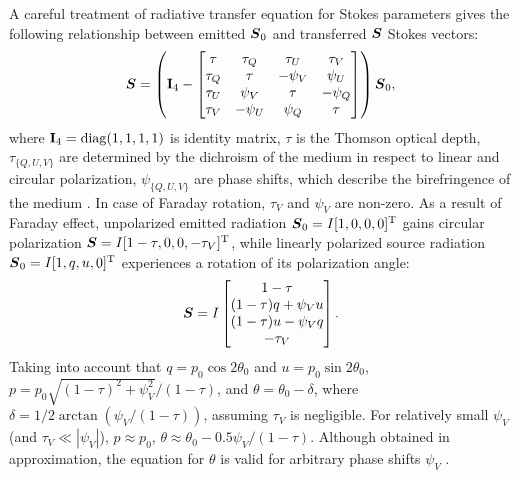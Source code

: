 A careful treatment of radiative transfer equation for Stokes parameters gives the following relationship between emitted $\boldsymbol{S}_0$ and transferred $\boldsymbol{S}$ Stokes vectors:
\begin{equation}
    \label{eq:radiative_transport_stokes}
    \boldsymbol{S} = 
    \left(\mathbf{I}_4 - 
    \begin{bmatrix}
        \tau & \tau_Q & \tau_U & \tau_V \\
        \tau_Q & \tau & -\psi_V & \psi_U \\
        \tau_U & \psi_V & \tau & -\psi_Q \\
        \tau_V & -\psi_U & \psi_Q & \tau
    \end{bmatrix}\right)
    \boldsymbol{S}_0,
\end{equation}
where $\mathbf{I}_4 = \mathrm{diag}(1, 1, 1, 1)$ is identity matrix, $\tau$ is the Thomson optical depth, $\tau_{\{Q, U, V\}}$ are determined by the dichroism of the medium in respect to linear and circular polarization, $\psi_{\{Q, U, V\}}$ are phase shifts, which describe the birefringence of the medium \citep{PolarizationInCosmicMedium}.
In case of Faraday rotation, $\tau_V$ and $\psi_V$ are non-zero.
As a result of Faraday effect, unpolarized emitted radiation $\boldsymbol{S}_0 = I[1, 0, 0, 0]^{\mathrm{T}}$ gains circular polarization $\boldsymbol{S} = I[1-\tau, 0, 0, -\tau_V]^{\mathrm{T}}$, while linearly polarized source radiation $\boldsymbol{S}_0 = I[1, q, u, 0]^{\mathrm{T}}$ experiences a rotation of its polarization angle:
\begin{equation}
    \boldsymbol{S} = 
    I
    \begin{bmatrix}
        1 - \tau \\
        (1 - \tau) q + \psi_V u \\
        (1 - \tau) u - \psi_V q \\
        - \tau_V 
    \end{bmatrix}.
\end{equation}
Taking into account that $q = p_0\cos 2\theta_0$ and $u = p_0\sin 2\theta_0$, $p = p_0 \sqrt{(1 - \tau) ^2 + \psi_V^2} / (1 - \tau)$, and $\theta = \theta_0 - \delta$, where $\delta = 1/2\arctan \left(\psi_V / (1 - \tau)\right)$, assuming $\tau_V$ is negligible.
For relatively small $\psi_V$ (and $\tau_V \ll |\psi_V|$), $p \approx p_0$, $\theta \approx \theta_0 - 0.5\psi_V / (1 - \tau)$.
Although obtained in approximation, the equation for $\theta$ is valid for arbitrary phase shifts $\psi_V$ \citep{PolarizationInCosmicMedium}.

